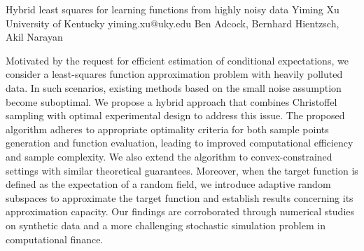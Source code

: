 \begin{talk}
  {Hybrid least squares for learning functions from highly noisy data}%
  {Yiming Xu}%
  {University of Kentucky}%
  {yiming.xu@uky.edu}%
  {Ben Adcock, Bernhard Hientzsch, Akil Narayan}%
  
    
   
Motivated by the request for efficient estimation of conditional expectations, we consider a least-squares function approximation problem with heavily polluted data. In such scenarios, existing methods based on the small noise assumption become suboptimal. We propose a hybrid approach that combines Christoffel sampling with optimal experimental design to address this issue. The proposed algorithm adheres to appropriate optimality criteria for both sample points generation and function evaluation, leading to improved computational efficiency and sample complexity. We also extend the algorithm to convex-constrained settings with similar theoretical guarantees. Moreover, when the target function is defined as the expectation of a random field, we introduce adaptive random subspaces to approximate the target function and establish results concerning its approximation capacity. Our findings are corroborated through numerical studies on synthetic data and a more challenging stochastic simulation problem in computational finance.
\medskip

\end{talk}
